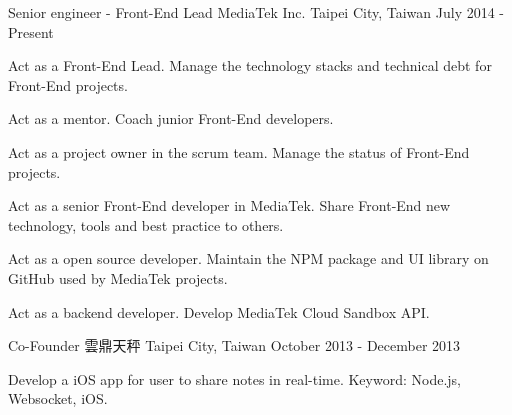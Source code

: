 

\begin{cventries}

  \cventry
    {Senior engineer - Front-End Lead} %
    {MediaTek Inc.} %
    {Taipei City, Taiwan} %
    {July 2014 - Present} %
    {
      \begin{cvitems} %
        \item {Act as a Front-End Lead. Manage the technology stacks and technical debt for Front-End projects.}
        \item {Act as a mentor. Coach junior Front-End developers.}
        \item {Act as a project owner in the scrum team. Manage the status of Front-End projects.}
        \item {Act as a senior Front-End developer in MediaTek. Share Front-End new technology, tools and best practice to others.}
        \item {Act as a open source developer. Maintain the NPM package and UI library on GitHub used by MediaTek projects.}
        \item {Act as a backend developer. Develop MediaTek Cloud Sandbox API.}
      \end{cvitems}
    }


  \cventry
    {Co-Founder} %
    {雲鼎天秤} %
    {Taipei City, Taiwan} %
    {October 2013 - December 2013} %
    {
      \begin{cvitems} %
        \item {Develop a iOS app for user to share notes in real-time. Keyword: Node.js, Websocket, iOS.}
      \end{cvitems}
    }


\end{cventries}
